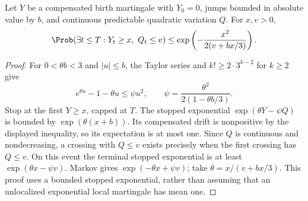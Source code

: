 \begin{lemma}\label{lem:exp}
Let \(Y\) be a compensated birth martingale with \(Y_0=0\), jumps
bounded in absolute value by \(b\), and continuous predictable
quadratic variation \(Q\). For \(x,v>0\),
\begin{equation}\label{eq:freedman}
 \Prob(\exists t\le T:Y_t\ge x,\ Q_t\le v)
 \le\exp\left(-\frac{x^2}{2(v+bx/3)}\right).
\end{equation}
\end{lemma}
\begin{proof}
For \(0<\theta b<3\) and \(|u|\le b\), the Taylor series and
\(k!\ge2\cdot3^{k-2}\) for \(k\ge2\) give
\[
 e^{\theta u}-1-\theta u
 \le\psi u^2,\qquad \psi=\frac{\theta^2}{2(1-\theta b/3)}.
\]
Stop at the first \(Y\ge x\), capped at \(T\). The stopped
exponential \(\exp(\theta Y-\psi Q)\) is bounded by
\(\exp(\theta(x+b))\). Its compensated drift is nonpositive by the
displayed inequality, so its expectation is at most one.
Since \(Q\) is continuous and nondecreasing, a crossing with
\(Q\le v\) exists precisely when the first crossing has \(Q\le v\).
On this event the terminal stopped exponential is at least
\(\exp(\theta x-\psi v)\). Markov gives
\(\exp(-\theta x+\psi v)\); take \(\theta=x/(v+bx/3)\).
This proof uses a bounded stopped exponential, rather than assuming
that an unlocalized exponential local martingale has mean one.
\end{proof}

